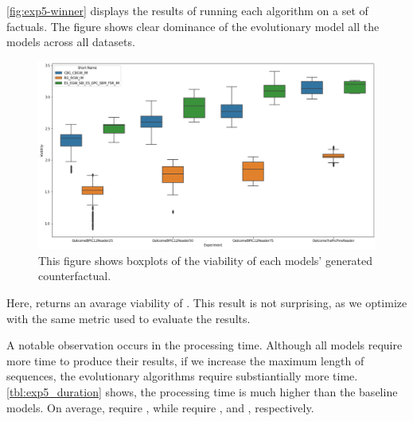 \documentclass[./../../paper.tex]{subfiles}
\begin{document}
\autoref{fig:exp5-winner} displays the results of running each algorithm on a set of factuals. The figure shows clear dominance of the evolutionary model all the models across all datasets. 

\begin{figure}[htbp]
    \centering
    \includegraphics[width=\textwidth]{figures/generated/exp5_winner_overall.png}
    \caption{This figure shows boxplots of the viability of each models' generated counterfactual.}
    \label{fig:exp5-winner}
\end{figure}

Here,  returns an avarage viability of . This result is not surprising, as we optimize with the same metric used to evaluate the results. 

A notable observation occurs in the processing time. Although all models require more time to produce their results, if we increase the maximum length of sequences, the evolutionary algorithms require substiantially more time. \autoref{tbl:exp5_duration} shows, the processing time is much higher than the baseline models. On average,  require , while  require ,  and , respectively.
\end{document}
